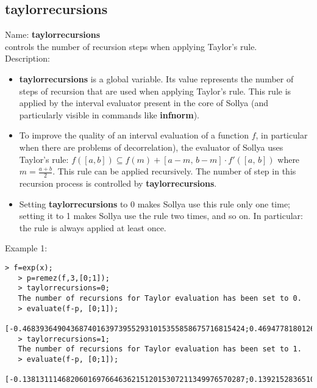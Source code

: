 \subsection{ taylorrecursions }
\noindent Name: \textbf{taylorrecursions}\\
controls the number of recursion steps when applying Taylor's rule.\\

\noindent Description: \begin{itemize}

\item \textbf{taylorrecursions} is a global variable. Its value represents the number of steps
   of recursion that are used when applying Taylor's rule. This rule is applied
   by the interval evaluator present in the core of Sollya (and particularly
   visible in commands like \textbf{infnorm}).

\item To improve the quality of an interval evaluation of a function $f$, in 
   particular when there are problems of decorrelation), the evaluator of Sollya
   uses Taylor's rule:  $f([a,b]) \subseteq f(m) + [a-m,\,b-m] \cdot f'([a,\,b])$ where $m=\frac{a+b}{2}$.
   This rule can be applied recursively.
   The number of step in this recursion process is controlled by \textbf{taylorrecursions}.

\item Setting \textbf{taylorrecursions} to 0 makes Sollya use this rule only one time;
   setting it to 1 makes Sollya use the rule two times, and so on.
   In particular: the rule is always applied at least once.
\end{itemize}
\noindent Example 1: 
\begin{center}\begin{minipage}{14.8cm}\begin{Verbatim}[frame=single]
   > f=exp(x);
   > p=remez(f,3,[0;1]);
   > taylorrecursions=0;
   The number of recursions for Taylor evaluation has been set to 0.
   > evaluate(f-p, [0;1]);
   [-0.468393649043687401639739552931015355858675716815424;0.469477818012697748765376148435266259461851121717393]
   > taylorrecursions=1;
   The number of recursions for Taylor evaluation has been set to 1.
   > evaluate(f-p, [0;1]);
   [-0.138131114682060169766463621512015307211349976570287;0.139215283651070516892100217016266210814525381472255]
\end{Verbatim}
\end{minipage}\end{center}

